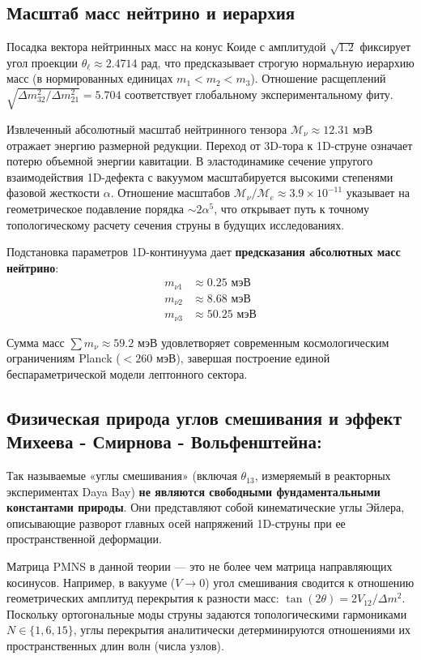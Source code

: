 \documentclass[12pt,a4paper]{article}
\begin{document}
	\subsection{Масштаб масс нейтрино и иерархия}
	Посадка вектора нейтринных масс на конус Коиде с амплитудой $\sqrt{1.2}$ фиксирует угол проекции $\theta_\ell \approx 2.4714$ рад, что предсказывает строгую нормальную иерархию масс (в нормированных единицах $m_1 < m_2 < m_3$). Отношение расщеплений $\sqrt{\Delta m^2_{32} / \Delta m^2_{21}} = 5.704$ соответствует глобальному экспериментальному фиту.
	
	Извлеченный абсолютный масштаб нейтринного тензора $\mathcal{M}_{\nu} \approx 12.31$ мэВ отражает энергию размерной редукции. Переход от 3D-тора к 1D-струне означает потерю объемной энергии кавитации. В эластодинамике сечение упругого взаимодействия 1D-дефекта с вакуумом масштабируется высокими степенями фазовой жесткости $\alpha$. Отношение масштабов $\mathcal{M}_\nu / \mathcal{M}_e \approx 3.9 \times 10^{-11}$ указывает на геометрическое подавление порядка $\sim 2\alpha^5$, что открывает путь к точному топологическому расчету сечения струны в будущих исследованиях.
	
	Подстановка параметров 1D-континуума дает \textbf{предсказания абсолютных масс нейтрино}:
	\begin{align}
		m_{\nu 1} &\approx \mathbf{0.25 \text{ мэВ}} \\
		m_{\nu 2} &\approx \mathbf{8.68 \text{ мэВ}} \\
		m_{\nu 3} &\approx \mathbf{50.25 \text{ мэВ}} 	
	\end{align}
	
	Сумма масс $\sum m_\nu \approx 59.2$ мэВ удовлетворяет современным космологическим ограничениям Planck ($< 260$ мэВ), завершая построение единой беспараметрической модели лептонного сектора.
	
	\subsection{Физическая природа углов смешивания и эффект Михеева - Смирнова - Вольфенштейна:}
	Так называемые «углы смешивания» (включая $\theta_{13}$, измеряемый в реакторных экспериментах Daya Bay) \textbf{не являются свободными фундаментальными константами природы}. Они представляют собой кинематические углы Эйлера, описывающие разворот главных осей напряжений 1D-струны при ее пространственной деформации. 
	
	Матрица PMNS в данной теории — это не более чем матрица направляющих косинусов. Например, в вакууме ($V \to 0$) угол смешивания сводится к отношению геометрических амплитуд перекрытия к разности масс: $\tan(2\theta) = 2V_{12}/\Delta m^2$. Поскольку ортогональные моды струны задаются топологическими гармониками $N \in \{1, 6, 15\}$, углы перекрытия аналитически детерминируются отношениями их пространственных длин волн (числа узлов).
	
\end{document}
